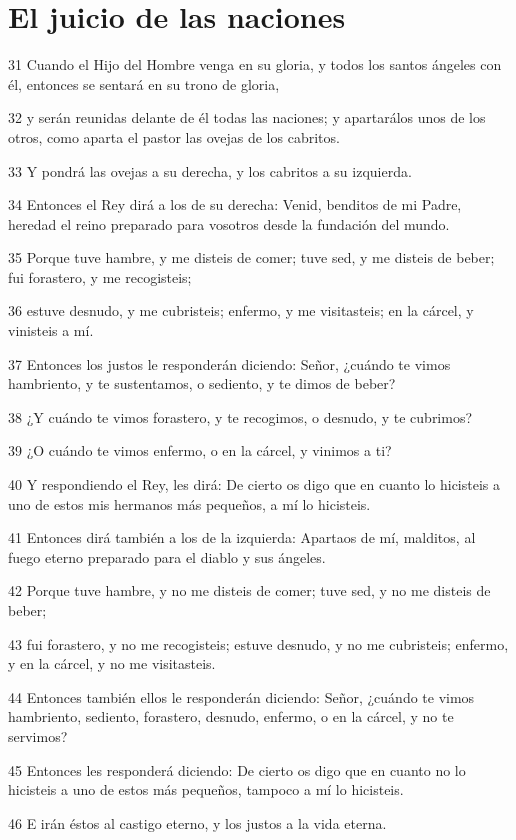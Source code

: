 \section*{El juicio de las naciones}

\par 31 Cuando el Hijo del Hombre venga en su gloria, y todos los santos ángeles con él, entonces se sentará en su trono de gloria,
\par 32 y serán reunidas delante de él todas las naciones; y apartarálos unos de los otros, como aparta el pastor las ovejas de los cabritos.
\par 33 Y pondrá las ovejas a su derecha, y los cabritos a su izquierda.
\par 34 Entonces el Rey dirá a los de su derecha: Venid, benditos de mi Padre, heredad el reino preparado para vosotros desde la fundación del mundo.
\par 35 Porque tuve hambre, y me disteis de comer; tuve sed, y me disteis de beber; fui forastero, y me recogisteis;
\par 36 estuve desnudo, y me cubristeis; enfermo, y me visitasteis; en la cárcel, y vinisteis a mí.
\par 37 Entonces los justos le responderán diciendo: Señor, ¿cuándo te vimos hambriento, y te sustentamos, o sediento, y te dimos de beber?
\par 38 ¿Y cuándo te vimos forastero, y te recogimos, o desnudo, y te cubrimos?
\par 39 ¿O cuándo te vimos enfermo, o en la cárcel, y vinimos a ti?
\par 40 Y respondiendo el Rey, les dirá: De cierto os digo que en cuanto lo hicisteis a uno de estos mis hermanos más pequeños, a mí lo hicisteis.
\par 41 Entonces dirá también a los de la izquierda: Apartaos de mí, malditos, al fuego eterno preparado para el diablo y sus ángeles.
\par 42 Porque tuve hambre, y no me disteis de comer; tuve sed, y no me disteis de beber;
\par 43 fui forastero, y no me recogisteis; estuve desnudo, y no me cubristeis; enfermo, y en la cárcel, y no me visitasteis.
\par 44 Entonces también ellos le responderán diciendo: Señor, ¿cuándo te vimos hambriento, sediento, forastero, desnudo, enfermo, o en la cárcel, y no te servimos?
\par 45 Entonces les responderá diciendo: De cierto os digo que en cuanto no lo hicisteis a uno de estos más pequeños, tampoco a mí lo hicisteis.
\par 46 E irán éstos al castigo eterno, y los justos a la vida eterna.

